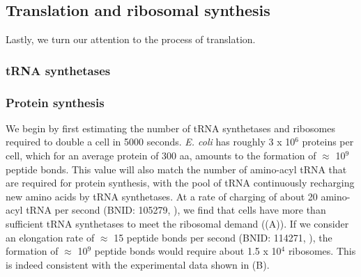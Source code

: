 \subsection{Translation and ribosomal synthesis}

Lastly, we turn our attention to the process of translation.

\subsubsection{tRNA synthetases}

\subsubsection{Protein synthesis}

  We begin by first
estimating the number of tRNA synthetases and ribosomes required to  double a
cell in 5000 seconds.  \textit{E. coli} has roughly 3 x 10$^6$ proteins per
cell, which for an average protein of 300 aa, amounts to the formation of
$\approx$ 10$^9$ peptide bonds. This value will also match the number of
amino-acyl tRNA that are required for protein synthesis, with the pool of tRNA continuously
recharging new amino acids by tRNA synthetases. At a rate of charging of about
20 amino-acyl tRNA per second (BNID: 105279, \cite{milo2010}), we find that
cells have more than sufficient tRNA synthetases to meet the ribosomal demand
((A)). If we consider an elongation rate of $\approx$ 15
peptide bonds per second (BNID: 114271, \cite{milo2010, dai2016}), the formation
of $\approx$ 10$^9$ peptide bonds would require about 1.5 x 10$^4$ ribosomes.
This is indeed consistent with the experimental data shown in
(B).

